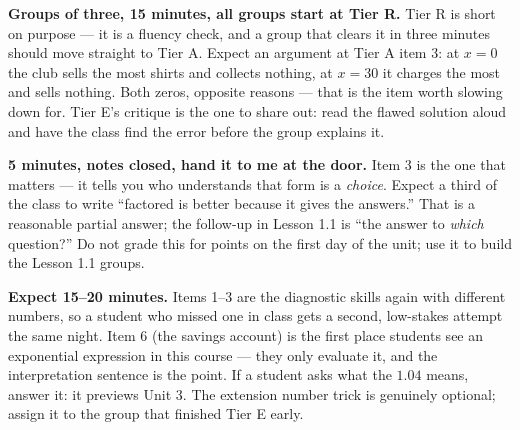 \documentclass[10pt]{article}
\begin{document}
\begin{teachernote}
    \textbf{Groups of three, 15 minutes, all groups start at Tier R.} Tier R is short on purpose
    --- it is a fluency check, and a group that clears it in three minutes should move straight
    to Tier A. Expect an argument at Tier A item 3: at $x=0$ the club sells the most shirts and
    collects nothing, at $x=30$ it charges the most and sells nothing. Both zeros, opposite
    reasons --- that is the item worth slowing down for. Tier E's critique is the one to share
    out: read the flawed solution aloud and have the class find the error before the group
    explains it.
\end{teachernote}

\begin{teachernote}
    \textbf{5 minutes, notes closed, hand it to me at the door.} Item 3 is the one that matters
    --- it tells you who understands that form is a \emph{choice}. Expect a third of the class to
    write ``factored is better because it gives the answers.'' That is a reasonable partial
    answer; the follow-up in Lesson 1.1 is ``the answer to \emph{which} question?'' Do not
    grade this for points on the first day of the unit; use it to build the Lesson 1.1 groups.
\end{teachernote}

\begin{teachernote}[Homework]
    \textbf{Expect 15--20 minutes.} Items 1--3 are the diagnostic skills again with different
    numbers, so a student who missed one in class gets a second, low-stakes attempt the same
    night. Item 6 (the savings account) is the first place students see an exponential
    expression in this course --- they only evaluate it, and the interpretation sentence is the
    point. If a student asks what the $1.04$ means, answer it: it previews Unit 3. The extension
    number trick is genuinely optional; assign it to the group that finished Tier E early.
\end{teachernote}
\end{document}

